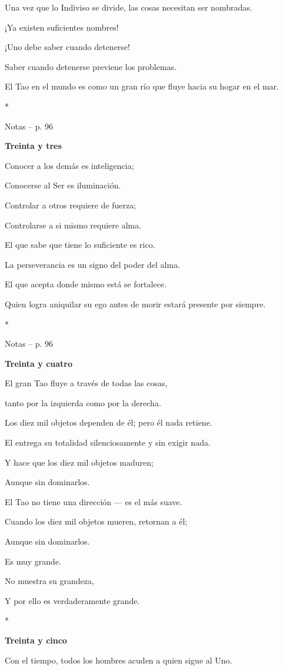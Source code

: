 Una vez que lo Indiviso se divide, las cosas necesitan ser nombradas.

¡Ya existen suficientes nombres!

¡Uno debe saber cuando detenerse!

Saber cuando detenerse previene los problemas.

El Tao en el mundo es como un gran río que fluye hacia su hogar en el
mar.

*

Notas -- p. 96

\textbf{Treinta y tres}

Conocer a los demás es inteligencia;

Conocerse al Ser es iluminación.

Controlar a otros requiere de fuerza;

Controlarse a si mismo requiere alma.

El que sabe que tiene lo suficiente es rico.

La perseverancia es un signo del poder del alma.

El que acepta donde mismo está se fortalece.

Quien logra aniquilar su ego antes de morir estará presente por siempre.

*

Notas -- p. 96

\textbf{Treinta y cuatro}

El gran Tao fluye a través de todas las cosas,

tanto por la izquierda como por la derecha.

Los diez mil objetos dependen de él; pero él nada retiene.

El entrega su totalidad silenciosamente y sin exigir nada.

Y hace que los diez mil objetos maduren;

Aunque sin dominarlos.

El Tao no tiene una dirección --- es el más suave.

Cuando los diez mil objetos mueren, retornan a él;

Aunque sin dominarlos.

Es muy grande.

No muestra su grandeza,

Y por ello es verdaderamente grande.

*

\textbf{Treinta y cinco}

Con el tiempo, todos los hombres acuden a quien sigue al Uno.

